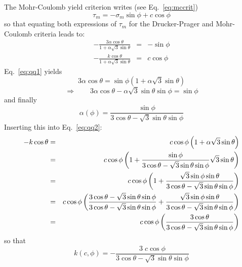 \vspace{.5cm}

The Mohr-Coulomb yield criterion writes  (see Eq.~\eqref{eq:mccrit})
\[
\tau_m = -\sigma_m \sin\phi + c \cos\phi
\]
so that equating both expressions of $\tau_m$ for the Drucker-Prager 
and Mohr-Coulomb criteria leads to:
\begin{eqnarray}
-\frac{3 \alpha \cos\theta}{1 + \alpha \sqrt{3}\sin\theta} &=& -\sin\phi \label{eq:qq1}\\
-\frac{k\cos\theta}{1 + \alpha \sqrt{3}\sin\theta} &=& c \cos\phi \label{eq:qq2}
\end{eqnarray}
Eq.~\eqref{eq:qq1} yields
\[
3 \alpha \cos\theta = \sin\phi (1 + \alpha \sqrt{3}\sin\theta) 
\]
\[
\Rightarrow \qquad 3 \alpha \cos\theta - \alpha \sqrt{3}\sin\theta \sin\phi = \sin\phi 
\]
and finally 
\[
\boxed{
\alpha(\phi) =  \frac{\sin\phi}{ 3 \cos\theta - \sqrt{3}\sin\theta \sin\phi}
}
\]
Inserting this into Eq.~\eqref{eq:qq2}:
\begin{eqnarray}
- k \cos\theta 
&=& c \cos \phi \left(1 +\alpha \sqrt{3} \sin\theta \right)  \nonumber\\
&=& c \cos \phi \left(1 + \frac{\sin\phi}{ 3 \cos\theta - \sqrt{3}\sin\theta \sin\phi}  \sqrt{3} \sin\theta\right) \nonumber\\
&=& c \cos \phi \left(1 + 
\frac{ \sqrt{3}\sin\phi \sin\theta }{ 3 \cos\theta - \sqrt{3}\sin\theta \sin\phi} \right) \nonumber\\
&=& c \cos \phi \left(
\frac{ 3 \cos\theta - \sqrt{3}\sin\theta \sin\phi}{ 3 \cos\theta - \sqrt{3}\sin\theta \sin\phi} 
+ 
\frac{ \sqrt{3}\sin\phi \sin\theta }{ 3 \cos\theta - \sqrt{3}\sin\theta \sin\phi} \right) \nonumber\\
&=& c \cos \phi \left(
\frac{ 3 \cos\theta}{ 3 \cos\theta - \sqrt{3}\sin\theta \sin\phi} \right) \nonumber
\end{eqnarray}
so that 
\[
\boxed{
k(c,\phi) =- \frac{ 3\; c \cos \phi }{ 3 \cos\theta - \sqrt{3}\sin\theta \sin\phi} 
}
\]

